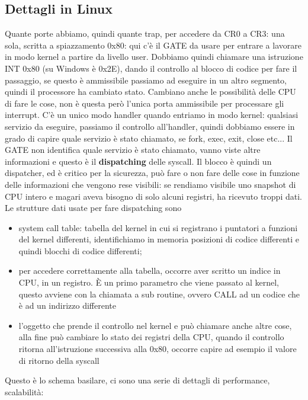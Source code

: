 \documentclass[12pt, oneside]{extbook}
\begin{document}
\subsection{Dettagli in Linux}
Quante porte abbiamo, quindi quante trap, per accedere da CR0 a CR3: una sola, scritta a spiazzamento 0x80: qui c'è il GATE da usare per entrare a lavorare in modo kernel a partire da livello user. Dobbiamo quindi chiamare una istruzione \textsf{INT 0x80} (su Windows è 0x2E), dando il controllo al blocco di codice per fare il passaggio, se questo  è ammissibile passiamo ad eseguire in un altro segmento, quindi il processore ha cambiato stato. Cambiano anche le possibilità delle CPU di fare le cose, non è questa però l'unica porta ammissibile per processare gli interrupt. C'è un unico modo handler quando entriamo in modo kernel: qualsiasi servizio da eseguire, passiamo il controllo all'handler, quindi dobbiamo essere in grado di capire quale servizio è stato chiamato, se fork, exec, exit, close etc... Il GATE non identifica quale servizio è stato chiamato, vanno viste altre informazioni e questo è il \textbf{dispatching} delle syscall. Il blocco è quindi un dispatcher, ed è critico per la sicurezza, può fare o non fare delle cose in funzione delle informazioni che vengono rese visibili: se rendiamo visibile uno snapshot di CPU intero e magari aveva bisogno di solo alcuni registri, ha ricevuto troppi dati. Le strutture dati usate per fare dispatching sono
\begin{itemize}
\item system call table: tabella del kernel in cui si registrano i puntatori a funzioni del kernel differenti, identifichiamo in memoria posizioni di codice differenti e quindi blocchi di codice differenti;
\item per accedere correttamente alla tabella, occorre aver scritto un indice in CPU, in un registro. È un primo parametro che viene passato al kernel, questo avviene con la chiamata a sub routine, ovvero CALL ad un codice che è ad un indirizzo differente
\item l'oggetto che prende il controllo nel kernel e può chiamare anche altre cose, alla fine può cambiare lo stato dei registri della CPU, quando il controllo ritorna all'istruzione successiva alla 0x80, occorre capire ad esempio il valore di ritorno della syscall
\end{itemize}
Questo è lo schema basilare, ci sono una serie di dettagli di performance, scalabilità:
\end{document}
